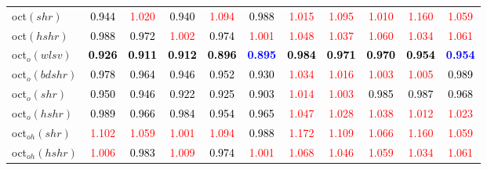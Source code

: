 \begin{tabular}[t]{l|>{}cccc>{}c|ccccc}
oct$(shr)$ & \textcolor{black}{0.944} & \textcolor{red}{1.020} & \textcolor{black}{0.940} & \textcolor{red}{1.094} & \textcolor{black}{0.988} & \textcolor{red}{1.015} & \textcolor{red}{1.095} & \textcolor{red}{1.010} & \textcolor{red}{1.160} & \textcolor{red}{1.059}\\
oct$(hshr)$ & \textcolor{black}{0.988} & \textcolor{black}{0.972} & \textcolor{red}{1.002} & \textcolor{black}{0.974} & \textcolor{red}{1.001} & \textcolor{red}{1.048} & \textcolor{red}{1.037} & \textcolor{red}{1.060} & \textcolor{red}{1.034} & \textcolor{red}{1.061}\\
oct$_o(wlsv)$ & \textcolor{black}{\textbf{0.926}} & \textcolor{black}{\textbf{0.911}} & \textcolor{black}{\textbf{0.912}} & \textcolor{black}{\textbf{0.896}} & \textcolor{blue}{\textbf{0.895}} & \textcolor{black}{\textbf{0.984}} & \textcolor{black}{\textbf{0.971}} & \textcolor{black}{\textbf{0.970}} & \textcolor{black}{\textbf{0.954}} & \textcolor{blue}{\textbf{0.954}}\\
oct$_o(bdshr)$ & \textcolor{black}{0.978} & \textcolor{black}{0.964} & \textcolor{black}{0.946} & \textcolor{black}{0.952} & \textcolor{black}{0.930} & \textcolor{red}{1.034} & \textcolor{red}{1.016} & \textcolor{red}{1.003} & \textcolor{red}{1.005} & \textcolor{black}{0.989}\\
oct$_o(shr)$ & \textcolor{black}{0.950} & \textcolor{black}{0.946} & \textcolor{black}{0.922} & \textcolor{black}{0.925} & \textcolor{black}{0.903} & \textcolor{red}{1.014} & \textcolor{red}{1.003} & \textcolor{black}{0.985} & \textcolor{black}{0.987} & \textcolor{black}{0.968}\\
oct$_o(hshr)$ & \textcolor{black}{0.989} & \textcolor{black}{0.966} & \textcolor{black}{0.984} & \textcolor{black}{0.954} & \textcolor{black}{0.965} & \textcolor{red}{1.047} & \textcolor{red}{1.028} & \textcolor{red}{1.038} & \textcolor{red}{1.012} & \textcolor{red}{1.023}\\
oct$_{oh}(shr)$ & \textcolor{red}{1.102} & \textcolor{red}{1.059} & \textcolor{red}{1.001} & \textcolor{red}{1.094} & \textcolor{black}{0.988} & \textcolor{red}{1.172} & \textcolor{red}{1.109} & \textcolor{red}{1.066} & \textcolor{red}{1.160} & \textcolor{red}{1.059}\\
oct$_{oh}(hshr)$ & \textcolor{red}{1.006} & \textcolor{black}{0.983} & \textcolor{red}{1.009} & \textcolor{black}{0.974} & \textcolor{red}{1.001} & \textcolor{red}{1.068} & \textcolor{red}{1.046} & \textcolor{red}{1.059} & \textcolor{red}{1.034} & \textcolor{red}{1.061}\\

\end{tabular}
